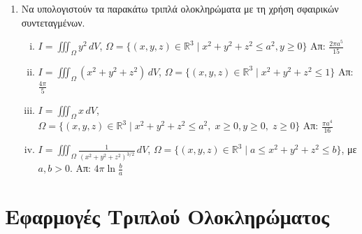 \begin{enumerate}
  \item Να υπολογιστούν τα παρακάτω τριπλά ολοκληρώματα με τη χρήση 
    σφαιρικών συντεταγμένων.

    \begin{enumerate}[i)]
      \item $ I = \iiint_{\Omega} y^{2} \,dV $, \quad $ \Omega = \{(x,y,z)\in 
        \mathbb{R}^{3} \mid x^{2}+y^{2}+z^{2} \leq a^{2}, y \geq 0 \} $ 
        \hfill Απ: $ \frac{2 \pi a^{5}}{15} $ 
      \item $ I= \iiint_{\Omega} (x^{2}+y^{2}+z^{2})\,dV $, \quad $ \Omega = 
        \{(x,y,z)\in \mathbb{R}^{3} \mid x^{2}+y^{2}+z^{2} \leq 1 \}$ 
        \hfill Απ: $ \frac{4 \pi}{5} $ 
      \item $ I=\iiint_{\Omega} x\,dV $, \quad $ \Omega = \{(x,y,z)\in \mathbb{R}^{3} 
        \mid x^{2}+y^{2}+z^{2} \leq a^{2},\; x \geq 0, y \geq 0,\; z \geq 0\} $ 
        \hfill Απ: $ \frac{\pi a^{4}}{16} $ 
      \item $ I = \iiint_{\Omega} \frac{1}{(x^{2}+y^{2}+z^{2})^{3/2}} \,dV$, \quad 
        $\Omega = \{ (x,y,z) \in \mathbb{R}^{3} \mid a \leq x^{2}+y^{2}+z^{2} \leq b \}$,
        με $ a,b > 0 $. \hfill Απ: $ 4 \pi \ln{\frac{b}{a}} $ 
    \end{enumerate}
\end{enumerate}



\section*{Εφαρμογές Τριπλού Ολοκληρώματος}


